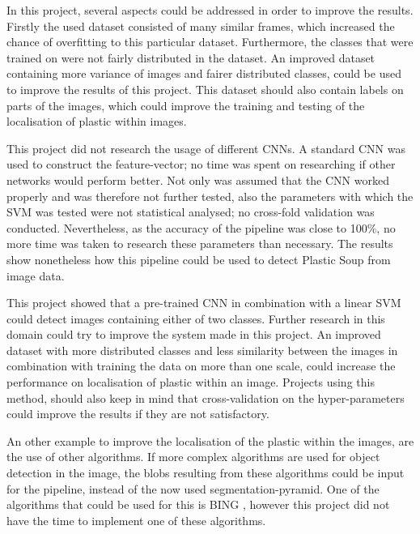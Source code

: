 In this project, several aspects could be addressed in order to improve the results.
Firstly the used dataset consisted of many similar frames, which increased the chance of overfitting to this particular dataset.
Furthermore, the classes that were trained on were not fairly distributed in the dataset.
An improved dataset containing more variance of images and fairer distributed classes, could be used to improve the results of this project.
This dataset should also contain labels on parts of the images, which could improve the training and testing of the localisation of plastic within images.

This project did not research the usage of different CNNs.
A standard CNN was used to construct the feature-vector; no time was spent on researching if other networks would perform better.
Not only was assumed that the CNN worked properly and was therefore not further tested, also the parameters with which the SVM was tested were not statistical analysed; no cross-fold validation was conducted.
Nevertheless, as the accuracy of the pipeline was close to 100\%, no more time was taken to research these parameters than necessary.
The results show nonetheless how this pipeline could be used to detect Plastic Soup from image data.

This project showed that a pre-trained CNN in combination with a linear SVM could detect images containing either of two classes.
Further research in this domain could try to improve the system made in this project.
An improved dataset with more distributed classes and less similarity between the images in combination with training the data on more than one scale, could increase the performance on localisation of plastic within an image.
Projects using this method, should also keep in mind that cross-validation on the hyper-parameters could improve the results if they are not satisfactory.

An other example to improve the localisation of the plastic within the images, are the use of other algorithms.
If more complex algorithms are used for object detection in the image, the blobs resulting from these algorithms could be input for the pipeline, instead of the now used segmentation-pyramid.
One of the algorithms that could be used for this is BING \citep{BingObj2014}, however this project did not have the time to implement one of these algorithms.

